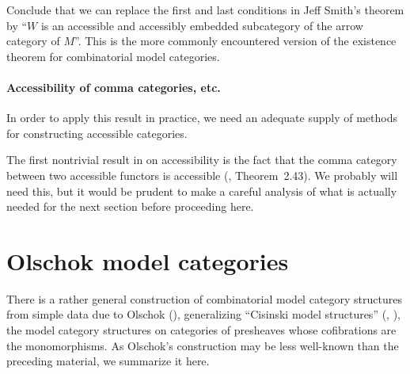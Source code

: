\documentclass{article}
\theoremstyle{definition}
\theoremstyle{plain}
\begin{document}
Conclude that we can replace the first and last conditions in Jeff Smith's theorem by ``$W$ is an accessible and accessibly embedded subcategory of the arrow category of $M$''.
This is the more commonly encountered version of the existence theorem for combinatorial model categories.

\paragraph{Accessibility of comma categories, etc.}
In order to apply this result in practice, we need an adequate supply of methods for constructing accessible categories.

The first nontrivial result in \cite{AR} on accessibility is the fact that the comma category between two accessible functors is accessible (\cite{AR}, Theorem~2.43).
We probably will need this, but it would be prudent to make a careful analysis of what is actually needed for the next section before proceeding here.

\section{Olschok model categories}

There is a rather general construction of combinatorial model category structures from simple data due to Olschok (\cite{O}), generalizing ``Cisinski model structures'' (\cite{C06}, \cite{C19}), the model category structures on categories of presheaves whose cofibrations are the monomorphisms.
As Olschok's construction may be less well-known than the preceding material, we summarize it here.
\end{document}
